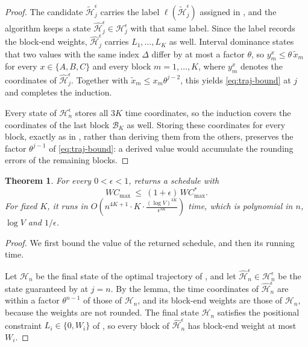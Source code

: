 ﻿\documentclass[12pt]{article}
\newtheorem{theorem}{Theorem}[section]
\begin{document}
\begin{sloppypar}
\begin{proof}
The candidate $\tilde{\mathscr{H}}^{\epsilon}_{j}$ carries the label
$\ell(\tilde{\mathscr{H}}^{\epsilon}_{j})$ assigned in , and the algorithm
keeps a state $\hat{\mathscr{H}}^{\epsilon}_{j}\in\mathscr{H}^{\epsilon}_{j}$ with that same label.
Since the label records the block-end weights, $\hat{\mathscr{H}}^{\epsilon}_{j}$ carries
$L_1,\dots,L_K$ as well. Interval dominance states that two values with the same index $\Delta$
differ by at most a factor $\theta$, so $y^{x}_{m}\le\theta\,\tilde x_{m}$ for every
$x\in\{A,B,C\}$ and every block $m=1,\dots,K$, where $y^{x}_{m}$ denotes the coordinates of
$\hat{\mathscr{H}}^{\epsilon}_{j}$. Together with $\tilde x_m\le x_m\theta^{j-2}$, this yields
\cref{eq:traj-bound} at $j$ and completes the induction.

Every state of $\mathscr{H}^{\epsilon}_n$ stores all $3K$ time coordinates, so the induction covers
the coordinates of the last block $\mathcal{B}_K$ as well. Storing these coordinates for every
block, exactly as in , rather than deriving them from the others, preserves
the factor $\theta^{j-1}$ of \cref{eq:traj-bound}: a derived value would accumulate the rounding
errors of the remaining blocks.
\end{proof}

\begin{theorem}\label{thm:fptas}
For every $0<\epsilon<1$,  returns a schedule with
\[
W C_{\max}\ \le\ (1+\epsilon)\,W C_{\max}^{*}.
\]
For fixed $K$, it runs in
$
O\!\left(n^{4K+1}\cdot K\cdot\frac{(\log V)^{3K}}{\epsilon^{3K}}\right)
$
time, which is polynomial in $n$, $\log V$ and $1/\epsilon$.
\end{theorem}

\begin{proof}
We first bound the value of the returned schedule, and then its running time.

Let $\mathscr{H}_{n}$ be the final state of the optimal trajectory of , and let
$\hat{\mathscr{H}}^{\epsilon}_{n}\in\mathscr{H}^{\epsilon}_{n}$ be the state guaranteed by
 at $j=n$. By the lemma, the time coordinates of
$\hat{\mathscr{H}}^{\epsilon}_{n}$ are within a factor $\theta^{n-1}$ of those of $\mathscr{H}_{n}$,
and its block-end weights are those of $\mathscr{H}_{n}$, because the weights are not rounded. The
final state $\mathscr{H}_{n}$ satisfies the positional constraint $L_i\in\{0,W_i\}$ of
, so every block of $\hat{\mathscr{H}}^{\epsilon}_{n}$ has block-end weight at
most $W_i$.


\end{proof}
\end{sloppypar}
\end{document}

